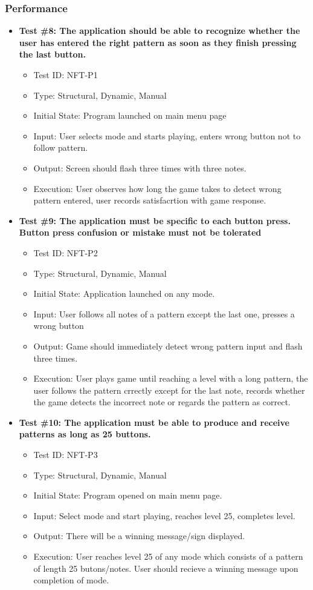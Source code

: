\documentclass[12pt, titlepage]{article}
\begin{document}
\subsubsection{Performance}
\begin{itemize}
\item \textbf{Test \#8: The application should be able to recognize whether the user has entered the right pattern as soon as they finish pressing the last button.}
\begin{itemize}
\item Test ID: NFT-P1
\item Type: Structural, Dynamic, Manual				
\item Initial State: Program launched on main menu page		
\item Input: User selects mode and starts playing, enters wrong button not to follow pattern.
\item Output: Screen should flash three times with three notes.		
\item Execution: User observes how long the game takes to detect wrong pattern entered, user records satisfacrtion with game response.
\end{itemize}

\item \textbf{Test \#9: The application must be specific to each button press. Button press confusion or mistake must not be tolerated}
\begin{itemize}
\item Test ID: NFT-P2
\item Type: Structural, Dynamic, Manual			
\item Initial State: Application launched on any mode.			
\item Input: User follows all notes of a pattern except the last one, presses a wrong button			
\item Output: Game should immediately detect wrong pattern input and flash three times.				
\item Execution: User plays game until reaching a level with a long pattern, the user follows the pattern crrectly except for the last note, records whether the game detects the incorrect note or regards the pattern as correct.
\end{itemize}

\item \textbf{Test \#10: The application must be able to produce and receive patterns as long as 25 buttons.}
\begin{itemize}
\item Test ID: NFT-P3
\item Type: Structural, Dynamic, Manual				
\item Initial State: Program opened on main menu page.		
\item Input: Select mode and start playing, reaches level 25, completes level.
\item Output: There will be a winning message/sign displayed.
\item Execution: User reaches level 25 of any mode which consists of a pattern of length 25 butons/notes. User should recieve a winning message upon completion of mode. 
\end{itemize}
\end{itemize}
\end{document}
